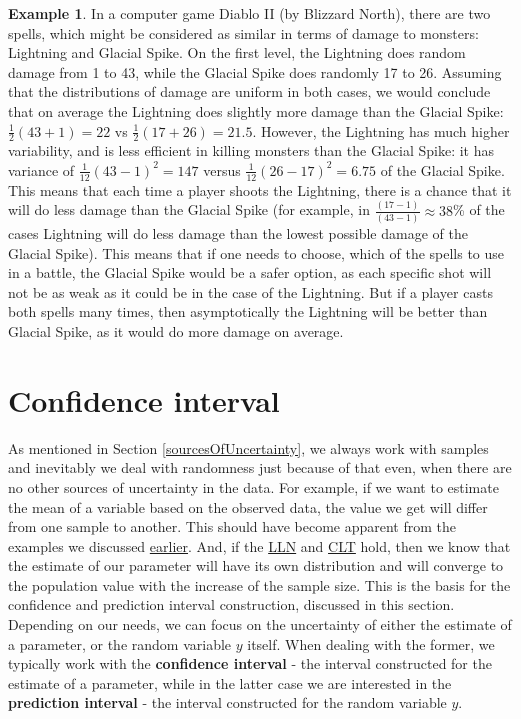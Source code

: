 \documentclass[
]{book}
\theoremstyle{definition}
\theoremstyle{definition}
\newtheorem{example}{Example}[chapter]
\theoremstyle{definition}
\theoremstyle{definition}
\theoremstyle{remark}
\begin{document}
\begin{example}
In a computer game Diablo II (by Blizzard North), there are two spells, which might be considered as similar in terms of damage to monsters: Lightning and Glacial Spike. On the first level, the Lightning does random damage from 1 to 43, while the Glacial Spike does randomly 17 to 26. Assuming that the distributions of damage are uniform in both cases, we would conclude that on average the Lightning does slightly more damage than the Glacial Spike: \(\frac{1}{2}(43+1)=22\) vs \(\frac{1}{2}(17+26)=21.5\). However, the Lightning has much higher variability, and is less efficient in killing monsters than the Glacial Spike: it has variance of \(\frac{1}{12}(43-1)^2 = 147\) versus \(\frac{1}{12}(26-17)^2 = 6.75\) of the Glacial Spike. This means that each time a player shoots the Lightning, there is a chance that it will do less damage than the Glacial Spike (for example, in \(\frac{(17-1)}{(43-1)} \approx 38\)\% of the cases Lightning will do less damage than the lowest possible damage of the Glacial Spike). This means that if one needs to choose, which of the spells to use in a battle, the Glacial Spike would be a safer option, as each specific shot will not be as weak as it could be in the case of the Lightning. But if a player casts both spells many times, then asymptotically the Lightning will be better than Glacial Spike, as it would do more damage on average.
\end{example}

\hypertarget{confidenceInterval}{%
\section{Confidence interval}\label{confidenceInterval}}

As mentioned in Section \ref{sourcesOfUncertainty}, we always work with samples and inevitably we deal with randomness just because of that even, when there are no other sources of uncertainty in the data. For example, if we want to estimate the mean of a variable based on the observed data, the value we get will differ from one sample to another. This should have become apparent from the examples we discussed \protect\hyperlink{estimatesProperties}{earlier}. And, if the \protect\hyperlink{LLN}{LLN} and \protect\hyperlink{CLT}{CLT} hold, then we know that the estimate of our parameter will have its own distribution and will converge to the population value with the increase of the sample size. This is the basis for the confidence and prediction interval construction, discussed in this section. Depending on our needs, we can focus on the uncertainty of either the estimate of a parameter, or the random variable \(y\) itself. When dealing with the former, we typically work with the \textbf{confidence interval} - the interval constructed for the estimate of a parameter, while in the latter case we are interested in the \textbf{prediction interval} - the interval constructed for the random variable \(y\).
\end{document}
